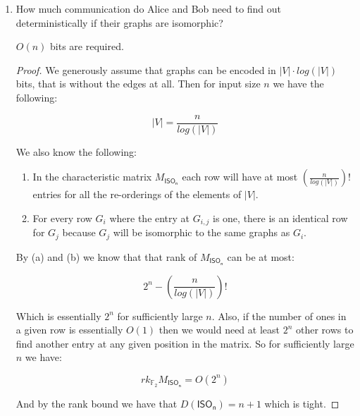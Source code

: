 \documentclass[usletter]{article}
\begin{document}

\begin{enumerate}
  \item How much communication do Alice and Bob need to find out deterministically if their graphs are isomorphic?

    \begin{claim}
      $O(n)$ bits are required.
    \end{claim}

    \begin{proof}
      We generously assume that graphs can be encoded in $|V| \cdot log(|V|)$ bits, that is without the edges at all. Then for input size $n$ we have the following:

      \begin{equation}
        |V| = \frac{n}{log(|V|)}
      \end{equation}

      We also know the following:

      \begin{enumerate}
        \item In the characteristic matrix $M_{\mathsf{ISO_n}}$ each row will have at most $\left (\frac{n}{log(|V|)}\right)!$ entries for all the re-orderings of the elements of $|V|$.
        \item For every row $G_i$ where the entry at $G_{i,j}$ is one, there is an identical row for $G_j$ because $G_j$ will be isomorphic to the same graphs as $G_i$.
      \end{enumerate}

      By (a) and (b) we know that that rank of $M_{\mathsf{ISO_n}}$ can be at most:

      \begin{equation}
        2^n - \left (\frac{n}{log(|V|)}\right)!
      \end{equation}

      Which is essentially $2^n$ for sufficiently large $n$. Also, if the number of ones in a given row is essentially $O(1)$ then we would need at least $2^n$ other rows to find another entry at any given position in the matrix. So for sufficiently large $n$ we have:

      \begin{equation}
        rk_{\mathbb{F}_2} M_{\mathsf{ISO_n}} = O(2^n)
      \end{equation}

      And by the rank bound we have that $D(\mathsf{ISO_n}) = n + 1$ which is tight.
    \end{proof}


\end{enumerate}
\end{document}
